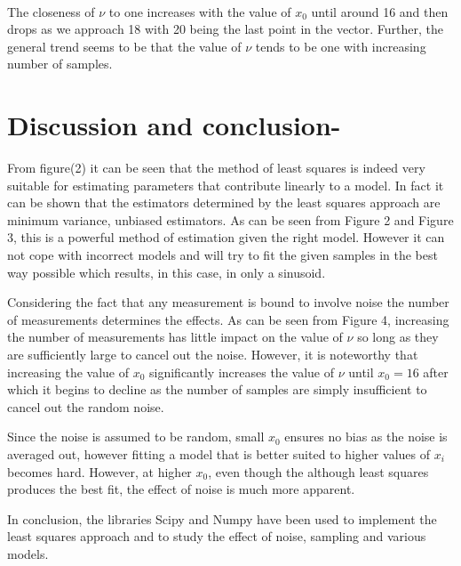 \documentclass[11pt]{article}
\begin{document}
    \begin{center}
    \end{center}
    { \hspace*{\fill} \\}
    
    The closeness of $\nu$ to one increases with the value of $x_0$ until
around 16 and then drops as we approach 18 with 20 being the last point
in the vector. Further, the general trend seems to be that the value of
$\nu$ tends to be one with increasing number of samples.

    \section{Discussion and conclusion-}\label{discussion-and-conclusion-}

From figure(2) it can be seen that the method of least squares is indeed
very suitable for estimating parameters that contribute linearly to a
model. In fact it can be shown that the estimators determined by the
least squares approach are minimum variance, unbiased estimators. As can
be seen from Figure 2 and Figure 3, this is a powerful method of
estimation given the right model. However it can not cope with incorrect
models and will try to fit the given samples in the best way possible
which results, in this case, in only a sinusoid.

Considering the fact that any measurement is bound to involve noise the
number of measurements determines the effects. As can be seen from
Figure 4, increasing the number of measurements has little impact on the
value of $\nu$ so long as they are sufficiently large to cancel out the
noise. However, it is noteworthy that increasing the value of $x_0$
significantly increases the value of $\nu$ until $x_0 = 16$ after which
it begins to decline as the number of samples are simply insufficient to
cancel out the random noise.

Since the noise is assumed to be random, small $x_0$ ensures no bias as
the noise is averaged out, however fitting a model that is better suited
to higher values of $x_i$ becomes hard. However, at higher $x_0$, even
though the although least squares produces the best fit, the effect of
noise is much more apparent.

In conclusion, the libraries Scipy and Numpy have been used to implement
the least squares approach and to study the effect of noise, sampling
and various models.


    
    
    
    
\end{document}
